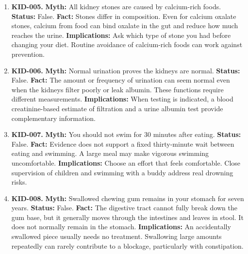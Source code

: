 \documentclass[11pt,oneside]{book}
\begin{document}
\begin{enumerate}[leftmargin=0pt,labelwidth=0pt,labelsep=0pt,itemindent=0pt]
\textbf{Implications:} Seek urgent care for suspected stone pain with fever or chills, inability to pass urine, or uncontrolled pain.
\item[] \textbf{KID-005.} \textbf{Myth:} All kidney stones are caused by calcium-rich foods.\newline
\textbf{Status:} False.\newline
\textbf{Fact:} Stones differ in composition. Even for calcium oxalate stones, calcium from food can bind oxalate in the gut and reduce how much reaches the urine. \cite{ref343}\newline
\textbf{Implications:} Ask which type of stone you had before changing your diet. Routine avoidance of calcium-rich foods can work against prevention.
\item[] \textbf{KID-006.} \textbf{Myth:} Normal urination proves the kidneys are normal.\newline
\textbf{Status:} False.\newline
\textbf{Fact:} The amount or frequency of urination can seem normal even when the kidneys filter poorly or leak albumin. These functions require different measurements. \cite{ref267}\newline
\textbf{Implications:} When testing is indicated, a blood creatinine-based estimate of filtration and a urine albumin test provide complementary information.
\item[] \textbf{KID-007.} \textbf{Myth:} You should not swim for 30 minutes after eating.\newline
\textbf{Status:} False.\newline
\textbf{Fact:} Evidence does not support a fixed thirty-minute wait between eating and swimming. A large meal may make vigorous swimming uncomfortable. \cite{ref344}\newline
\textbf{Implications:} Choose an effort that feels comfortable. Close supervision of children and swimming with a buddy address real drowning risks.
\item[] \textbf{KID-008.} \textbf{Myth:} Swallowed chewing gum remains in your stomach for seven years.\newline
\textbf{Status:} False.\newline
\textbf{Fact:} The digestive tract cannot fully break down the gum base, but it generally moves through the intestines and leaves in stool. It does not normally remain in the stomach. \cite{ref206}\newline
\textbf{Implications:} An accidentally swallowed piece usually needs no treatment. Swallowing large amounts repeatedly can rarely contribute to a blockage, particularly with constipation.

\end{enumerate}
\end{document}
